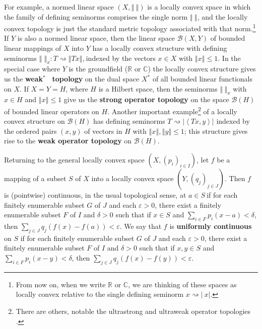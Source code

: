 \documentclass{article}%
\begin{document}
For example, a normed linear space $\left(  X,\left\Vert \ \right\Vert
\right)  $ is a locally convex space in which the family of defining seminorms
comprises the single norm $\left\Vert \ \right\Vert $, and the locally convex
topology is just the standard metric topology associated with that
norm.\footnote{%
\normalfont\sf
From now on, when we write $\mathbb{R}$ or $\mathbb{C}$, we are thinking of
these spaces as locally convex relative to the single defining seminorm
$x\rightsquigarrow\left\vert \ x\right\vert $.} If $Y$ is also a normed linear
space, then the linear space $\mathcal{B}(X,Y)$ of bounded linear mappings of
$X$ into $Y$ has a locally convex structure with defining seminorms
$\left\Vert \;\right\Vert _{x}:T\rightsquigarrow\left\Vert Tx\right\Vert
$,$\ $indexed by the vectors $x\in X$ with $\left\Vert x\right\Vert \leq1$. In
the special case where $Y$ is the groundfield ($\mathbb{R}$ or $\mathbb{C}$)
the locally convex structure gives us the \textbf{weak}$^{\ast}$%
\textbf{\ topology} on the dual space $X^{\ast}$ of all bounded linear
functionals on $X$. If $X=Y=H$, where $H$ is a Hilbert space, then the
seminorms $\left\Vert \ \right\Vert _{x}$ with $x\in H$ and $\left\Vert
x\right\Vert \leq1$ give us the \textbf{strong operator topology} on the space
$\mathcal{B}(H)$ of bounded linear operators on $H$. Another important
example\footnote{%
\normalfont\sf
There are others, notable the ultrastrong and ultraweak operator topologies
\cite[Chapter 1]{KR}.} of a locally convex structure on $\mathcal{B}(H)$ has
defining seminorms $T\rightsquigarrow\left\vert \left\langle Tx,y\right\rangle
\right\vert $ indexed by the ordered pairs $\left(  x,y\right)  $ of vectors
in $H$ with $\left\Vert x\right\Vert ,\left\Vert y\right\Vert \leq1$; this
structure gives rise to the \textbf{weak operator topology }on $\mathcal{B}%
(H)$.

Returning to the general locally convex space $\left(  X,\left(  p_{i}\right)
_{i\in I}\right)  $, let $f$ be a mapping of a subset $S$ of $X$ into a
locally convex space $\left(  Y,\left(  q_{j}\right)  _{j\in J}\right)  $.
Then $f$ is (pointwise) continuous, in the usual topological sense, at $a\in
S\ $if for each finitely enumerable subset $G$ of $J$ and each $\varepsilon
>0$, there exist a finitely enumerable subset $F$ of $I$ and $\delta>0$ such
that if $x\in S$ and $\sum_{i\in F}p_{i}(x-a)<\delta$, then $\sum_{j\in
J}q_{j}(f(x)-f(a))<\varepsilon$. We say that $f$ is \textbf{uniformly
continuous} on $S$ if for each finitely enumerable subset $G$ of $J$ and each
$\varepsilon>0$, there exist a finitely enumerable subset $F$ of $I$ and
$\delta>0$ such that if $x,y\in S$ and $\sum_{i\in F}p_{i}(x-y)<\delta$, then
$\sum_{j\in J}q_{j}(f(x)-f(y))<\varepsilon$.
\end{document}
